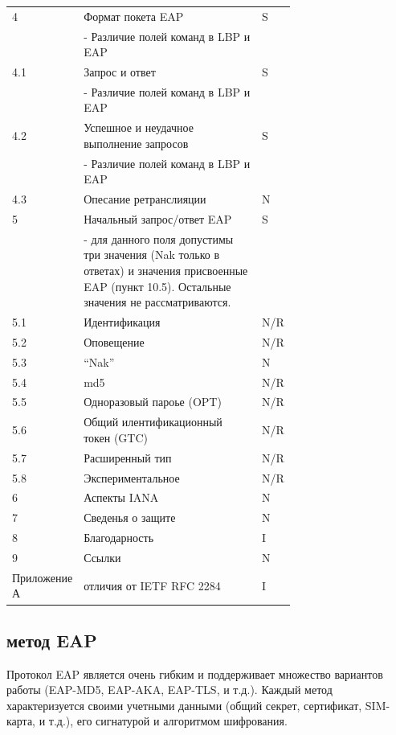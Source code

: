 \begin{longtable}{|l|p{0.7\linewidth}|l|}
   \hline
   4 & Формат покета EAP & S \\
   & - Различие полей команд в LBP и EAP & \\
   \hline
   4.1 & Запрос и ответ & S \\   
   & - Различие полей команд в LBP и EAP & \\
   \hline
   4.2 & Успешное и неудачное выполнение запросов & S \\
   & - Различие полей команд в LBP и EAP & \\
   \hline
   4.3 & Опесание ретранслияции& N \\
   \hline
   5 & Начальный запрос/ответ EAP & S \\
   & - для данного поля допустимы три значения (Nak только в ответах) и значения присвоенные EAP (пункт 10.5). Остальные значения не рассматриваются. & \\
   \hline
   5.1 & Идентификация & N/R \\
   \hline
   5.2 & Оповещение & N/R \\
   \hline
   5.3 & ``Nak'' & N \\
   \hline
   5.4 & md5 & N/R \\
   \hline
   5.5 & Одноразовый пароье (OPT) & N/R \\
   \hline
   5.6 & Общий илентификационный токен (GTC) & N/R \\
   \hline
   5.7 & Расширенный тип & N/R \\
   \hline 
   5.8 & Экспериментальное & N/R \\
   \hline
   6 & Аспекты IANA & N \\
   \hline
   7 & Сведенья о защите & N \\
   \hline
   8 & Благодарность & I \\
   \hline
   9 & Ссылки & N \\
   \hline
   Приложение А & отличия от IETF RFC 2284 & I \\
   \hline    
\end{longtable}

\subsection{метод EAP}

Протокол EAP является очень гибким и поддерживает множество вариантов работы (EAP-MD5, EAP-AKA, EAP-TLS, и т.д.). Каждый метод характеризуется своими учетными данными (общий секрет, сертификат, SIM-карта, и т.д.), его сигнатурой и алгоритмом шифрования.

